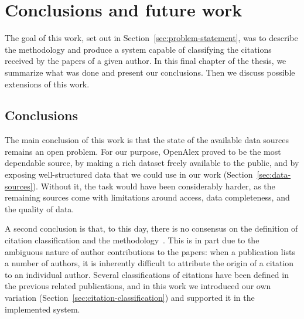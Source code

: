 
\chapter{Conclusions and future work} \label{c5:conclusions}


%

The goal of this work, set out in Section~\ref{sec:problem-statement}, was to describe the methodology and produce a system capable of classifying the citations received by the papers of a given author.
In this final chapter of the thesis, we summarize what was done and present our conclusions.
Then we discuss possible extensions of this work.

\section{Conclusions} \label{sec:conclusions}

The main conclusion of this work is that the state of the available data sources remains an open problem.
For our purpose, \textsf{OpenAlex} proved to be the most dependable source, by making a rich dataset freely available to the public, and by exposing well-structured data that we could use in our work (Section~\ref{sec:data-sources}).
Without it, the task would have been considerably harder, as the remaining sources come with limitations around access, data completeness, and the quality of data.

A second conclusion is that, to this day, there is no consensus on the definition of citation classification and the methodology~\cite{Glnzel2003BIBLIOMETRICSAA, Costas2010}.
This is in part due to the ambiguous nature of author contributions to the papers: when a publication lists a number of authors, it is inherently difficult to attribute the origin of a citation to an individual author.
Several classifications of citations have been defined in the previous related publications, and in this work we introduced our own variation (Section~\ref{sec:citation-classification}) and supported it in the implemented system.

